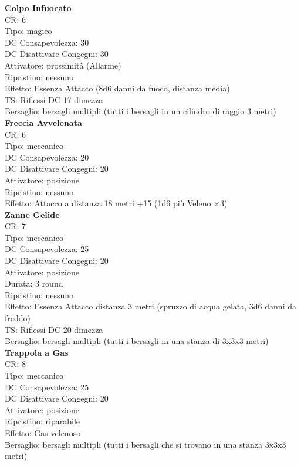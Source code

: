\documentclass[a4paper,11pt,twoside,openany]{book}
\begin{document}
{\begin{multicols}{2}
\textbf{Colpo Infuocato}\\
CR: 6 \\
Tipo: magico \\
DC Consapevolezza: 30 \\
DC Disattivare Congegni: 30 \\
Attivatore: prossimità (Allarme) \\
Ripristino: nessuno \\
Effetto: Essenza Attacco (8d6 danni da fuoco, distanza media)\\
TS: Riflessi DC 17 dimezza \\
Bersaglio: bersagli multipli (tutti i bersagli in un cilindro di raggio 3 metri)\\

\textbf{Freccia Avvelenata}\\
CR: 6 \\
Tipo: meccanico \\
DC Consapevolezza: 20 \\
DC Disattivare Congegni: 20 \\
Attivatore: posizione \\
Ripristino: nessuno \\
Effetto: Attacco a distanza 18 metri +15 (1d6 più Veleno ×3)\\

\textbf{Zanne Gelide}\\
CR: 7 \\
Tipo: meccanico \\
DC Consapevolezza: 25 \\
DC Disattivare Congegni: 20 \\
Attivatore: posizione \\
Durata: 3 round \\
Ripristino: nessuno \\
Effetto: Essenza Attacco distanza 3 metri (spruzzo di acqua gelata, 3d6 danni da freddo) \\
TS: Riflessi DC 20 dimezza \\
Bersaglio: bersagli multipli (tutti i bersagli in una stanza di 3x3x3 metri)\\

\textbf{Trappola a Gas}\\
CR: 8 \\
Tipo: meccanico \\
DC Consapevolezza: 25 \\
DC Disattivare Congegni: 20 \\
Attivatore: posizione \\
Ripristino: riparabile \\
Effetto: Gas velenoso \\
Bersaglio: bersagli multipli (tutti i bersagli che si trovano in una stanza 3x3x3 metri)\\


\end{multicols}}
\end{document}
